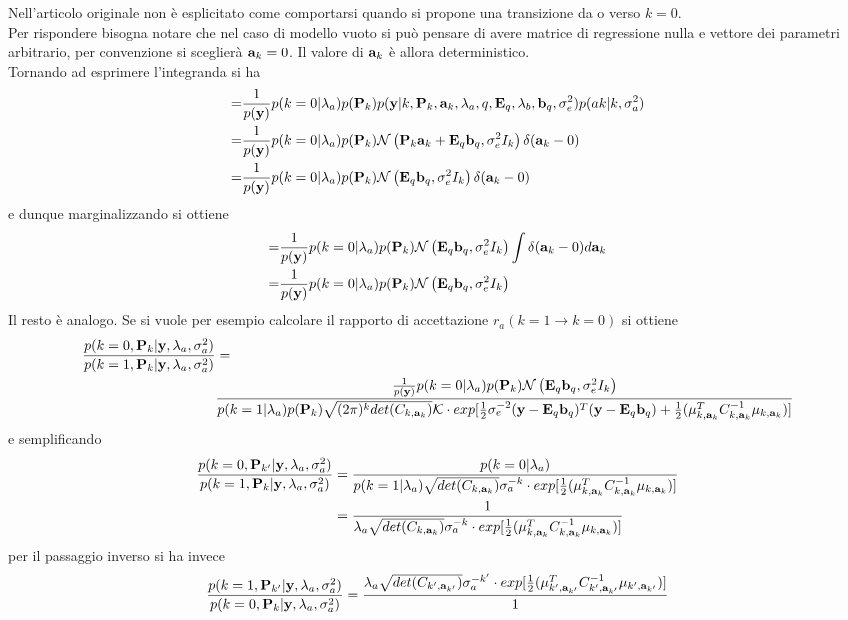 Nell'articolo originale non è esplicitato come comportarsi quando si propone una transizione da o verso $k=0$.\\
Per rispondere bisogna notare che nel caso di modello vuoto si può pensare di avere matrice di regressione nulla e vettore dei parametri arbitrario, per convenzione si sceglierà $\textbf{a}_k=0$. Il valore di $\textbf{a}_k$ è allora deterministico.\\
Tornando ad esprimere l'integranda si ha
\begin{align*}
=&\frac{1}{p(\textbf{y})}p(k=0|\lambda_a)p(\textbf{P}_k)p(\textbf{y}|k,\textbf{P}_k,\textbf{a}_k,\lambda_a,q,\textbf{E}_q,\lambda_b,\textbf{b}_q,\sigma_e^2)p(ak|k,\sigma_a^2)\\
=&\frac{1}{p(\textbf{y})}p(k=0|\lambda_a)p(\textbf{P}_k)\mathcal{N}\left(\textbf{P}_k\textbf{a}_k+\textbf{E}_q\textbf{b}_q,\sigma_e^2 I_k\right)\delta(\textbf{a}_k-0)\\
=&\frac{1}{p(\textbf{y})}p(k=0|\lambda_a)p(\textbf{P}_k)\mathcal{N}\left(\textbf{E}_q\textbf{b}_q,\sigma_e^2 I_k\right)\delta(\textbf{a}_k-0)\\
\end{align*}
e dunque marginalizzando si ottiene
\begin{align*}
=&\frac{1}{p(\textbf{y})}p(k=0|\lambda_a)p(\textbf{P}_k)\mathcal{N}\left(\textbf{E}_q\textbf{b}_q,\sigma_e^2 I_k\right)\int\delta(\textbf{a}_k-0)d\textbf{a}_k\\
=&\frac{1}{p(\textbf{y})}p(k=0|\lambda_a)p(\textbf{P}_k)\mathcal{N}\left(\textbf{E}_q\textbf{b}_q,\sigma_e^2 I_k\right)\\
\end{align*}
Il resto è analogo. Se si vuole per esempio calcolare il rapporto di accettazione $r_a(k=1\rightarrow k=0)$ si ottiene
\begin{align*}
\frac{p(k=0,\textbf{P}_k | \textbf{y},\lambda_a,\sigma_a^2)}{p(k=1,\textbf{P}_k | \textbf{y},\lambda_a,\sigma_a^2)}&=\\
&\frac{\frac{1}{p(\textbf{y})}p(k=0|\lambda_a)p(\textbf{P}_k)\mathcal{N}\left(\textbf{E}_q\textbf{b}_q,\sigma_e^2 I_k\right)}{p(k=1|\lambda_a)p(\textbf{P}_k)\sqrt{(2\pi)^k det(C_{k,\textbf{a}_k})}\mathcal{K}\cdot exp[\frac{1}{2} \sigma_e^{-2}(\textbf{y}-\textbf{E}_q\textbf{b}_q)^{T}(\textbf{y}-\textbf{E}_q\textbf{b}_q)+\frac{1}{2}(\mu_{k,\textbf{a}_k}^T C_{k,\textbf{a}_k}^{-1}\mu_{k,\textbf{a}_k})]}
\end{align*}
e semplificando
\begin{align*}
\frac{p(k=0,\textbf{P}_{k'} | \textbf{y},\lambda_a,\sigma_a^2)}{p(k=1,\textbf{P}_k | \textbf{y},\lambda_a,\sigma_a^2)}&=\frac{p(k=0|\lambda_a)}{p(k=1|\lambda_a)\sqrt{det(C_{k,\textbf{a}_k})}\sigma_a^{-k}\cdot exp[\frac{1}{2}(\mu_{k,\textbf{a}_k}^T C_{k,\textbf{a}_k}^{-1}\mu_{k,\textbf{a}_k})]}\\&=
\frac{1}{\lambda_a\sqrt{det(C_{k,\textbf{a}_k})}\sigma_a^{-k}\cdot exp[\frac{1}{2}(\mu_{k,\textbf{a}_k}^T C_{k,\textbf{a}_k}^{-1}\mu_{k,\textbf{a}_k})]}
\end{align*}
per il passaggio inverso si ha invece
\begin{align*}
\frac{p(k=1,\textbf{P}_{k'} | \textbf{y},\lambda_a,\sigma_a^2)}{p(k=0,\textbf{P}_k | \textbf{y},\lambda_a,\sigma_a^2)}=\frac{\lambda_a\sqrt{det(C_{k',\textbf{a}_{k'}})}\sigma_a^{-k'}\cdot exp[\frac{1}{2}(\mu_{k',\textbf{a}_{k'}}^T C_{k',\textbf{a}_{k'}}^{-1}\mu_{k',\textbf{a}_{k'}})]}{1}
\end{align*}